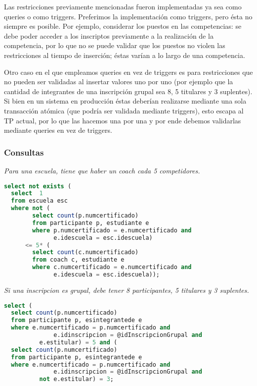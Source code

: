 \par Las restricciones previamente mencionadas fueron implementadas ya sea como queries o como triggers.
Preferimos la implementación como triggers, pero ésta no siempre es posible.
Por ejemplo, considerar los puestos en las competencias: se debe poder acceder a los inscriptos previamente a la realización de la competencia, por lo que no se puede validar que los puestos no violen las restricciones al tiempo de inserción; éstas varían a lo largo de una competencia.

\par Otro caso en el que empleamos queries en vez de triggers es para restricciones que no pueden ser validadas al insertar valores uno por uno (por ejemplo que la cantidad de integrantes de una inscripción grupal sea 8, 5 titulares y 3 suplentes).
Si bien en un sistema en producción éstas deberían realizarse mediante una sola transacción atómica (que podría ser validada mediante triggers), esto escapa al TP actual, por lo que las hacemos una por una y por ende debemos validarlas mediante queries en vez de triggers.


\subsubsection{Consultas}
\emph{Para una escuela, tiene que haber un coach cada 5 competidores.}

\begin{lstlisting}[language=SQL]
select not exists (
  select  1
  from escuela esc
  where not (
        select count(p.numcertificado)
        from participante p, estudiante e
        where p.numcertificado = e.numcertificado and
              e.idescuela = esc.idescuela)
      <= 5* (
        select count(c.numcertificado)
        from coach c, estudiante e
        where c.numcertificado = e.numcertificado and
              e.idescuela = esc.idescuela));
\end{lstlisting}

\emph{Si una inscripcion es grupal, debe tener 8 participantes, 5 titulares y 3 suplentes.}

\begin{lstlisting}[language=SQL]
select (
  select count(p.numcertificado)
  from participante p, esintegrantede e
  where e.numcertificado = p.numcertificado and
              e.idinscripcion = @idInscripcionGrupal and
	      e.estitular) = 5 and (
  select count(p.numcertificado)
  from participante p, esintegrantede e
  where e.numcertificado = p.numcertificado and
              e.idinscripcion = @idInscripcionGrupal and
	      not e.estitular) = 3;
\end{lstlisting}

